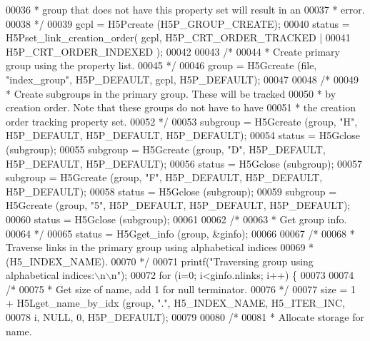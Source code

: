 \begin{DoxyCode}
00036 \textcolor{comment}{     * group that does not have this property set will result in an}
00037 \textcolor{comment}{     * error.}
00038 \textcolor{comment}{     */}
00039     gcpl = H5Pcreate (H5P\_GROUP\_CREATE);
00040     status = H5Pset\_link\_creation\_order( gcpl, H5P\_CRT\_ORDER\_TRACKED |
00041                 H5P\_CRT\_ORDER\_INDEXED );
00042 
00043     \textcolor{comment}{/*}
00044 \textcolor{comment}{     * Create primary group using the property list.}
00045 \textcolor{comment}{     */}
00046     group = H5Gcreate (file, \textcolor{stringliteral}{"index\_group"}, H5P\_DEFAULT, gcpl, H5P\_DEFAULT);
00047 
00048     \textcolor{comment}{/*}
00049 \textcolor{comment}{     * Create subgroups in the primary group.  These will be tracked}
00050 \textcolor{comment}{     * by creation order.  Note that these groups do not have to have}
00051 \textcolor{comment}{     * the creation order tracking property set.}
00052 \textcolor{comment}{     */}
00053     subgroup = H5Gcreate (group, \textcolor{stringliteral}{"H"}, H5P\_DEFAULT, H5P\_DEFAULT, H5P\_DEFAULT);
00054     status = H5Gclose (subgroup);
00055     subgroup = H5Gcreate (group, \textcolor{stringliteral}{"D"}, H5P\_DEFAULT, H5P\_DEFAULT, H5P\_DEFAULT);
00056     status = H5Gclose (subgroup);
00057     subgroup = H5Gcreate (group, \textcolor{stringliteral}{"F"}, H5P\_DEFAULT, H5P\_DEFAULT, H5P\_DEFAULT);
00058     status = H5Gclose (subgroup);
00059     subgroup = H5Gcreate (group, \textcolor{stringliteral}{"5"}, H5P\_DEFAULT, H5P\_DEFAULT, H5P\_DEFAULT);
00060     status = H5Gclose (subgroup);
00061 
00062     \textcolor{comment}{/*}
00063 \textcolor{comment}{     * Get group info.}
00064 \textcolor{comment}{     */}
00065     status = H5Gget\_info (group, &ginfo);
00066 
00067     \textcolor{comment}{/*}
00068 \textcolor{comment}{     * Traverse links in the primary group using alphabetical indices}
00069 \textcolor{comment}{     * (H5\_INDEX\_NAME).}
00070 \textcolor{comment}{     */}
00071     printf(\textcolor{stringliteral}{"Traversing group using alphabetical indices:\(\backslash\)n\(\backslash\)n"});
00072     \textcolor{keywordflow}{for} (i=0; i<ginfo.nlinks; i++) \{
00073 
00074         \textcolor{comment}{/*}
00075 \textcolor{comment}{         * Get size of name, add 1 for null terminator.}
00076 \textcolor{comment}{         */}
00077         size = 1 + H5Lget\_name\_by\_idx (group, \textcolor{stringliteral}{"."}, H5\_INDEX\_NAME, H5\_ITER\_INC,
00078                     i, NULL, 0, H5P\_DEFAULT);
00079 
00080         \textcolor{comment}{/*}
00081 \textcolor{comment}{         * Allocate storage for name.}

\end{DoxyCode}
